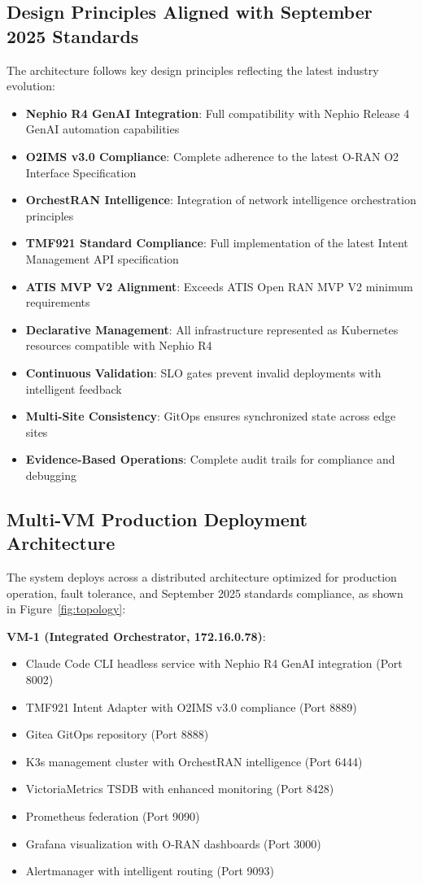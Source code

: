 \subsection{Design Principles Aligned with September 2025 Standards}

The architecture follows key design principles reflecting the latest industry evolution:

\begin{itemize}
\item \textbf{Nephio R4 GenAI Integration}: Full compatibility with Nephio Release 4 GenAI automation capabilities
\item \textbf{O2IMS v3.0 Compliance}: Complete adherence to the latest O-RAN O2 Interface Specification
\item \textbf{OrchestRAN Intelligence}: Integration of network intelligence orchestration principles
\item \textbf{TMF921 Standard Compliance}: Full implementation of the latest Intent Management API specification
\item \textbf{ATIS MVP V2 Alignment}: Exceeds ATIS Open RAN MVP V2 minimum requirements
\item \textbf{Declarative Management}: All infrastructure represented as Kubernetes resources compatible with Nephio R4
\item \textbf{Continuous Validation}: SLO gates prevent invalid deployments with intelligent feedback
\item \textbf{Multi-Site Consistency}: GitOps ensures synchronized state across edge sites
\item \textbf{Evidence-Based Operations}: Complete audit trails for compliance and debugging
\end{itemize}

\subsection{Multi-VM Production Deployment Architecture}

The system deploys across a distributed architecture optimized for production operation, fault tolerance, and September 2025 standards compliance, as shown in Figure~\ref{fig:topology}:

\textbf{VM-1 (Integrated Orchestrator, 172.16.0.78)}:
\begin{itemize}
\item Claude Code CLI headless service with Nephio R4 GenAI integration (Port 8002)
\item TMF921 Intent Adapter with O2IMS v3.0 compliance (Port 8889)
\item Gitea GitOps repository (Port 8888)
\item K3s management cluster with OrchestRAN intelligence (Port 6444)
\item VictoriaMetrics TSDB with enhanced monitoring (Port 8428)
\item Prometheus federation (Port 9090)
\item Grafana visualization with O-RAN dashboards (Port 3000)
\item Alertmanager with intelligent routing (Port 9093)
\end{itemize}

